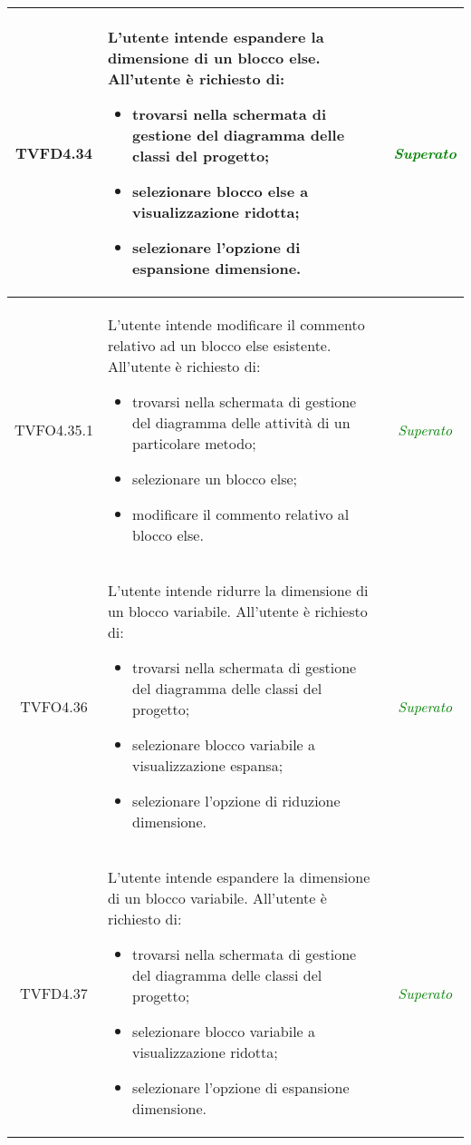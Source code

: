 \begin{longtable}{|c|>{}m{8cm}|c|}
\hypertarget{TVFD4.34}{TVFD4.34} & L'utente intende espandere la dimensione di un blocco else.
All'utente è richiesto di:
\begin{itemize}
	\item trovarsi nella schermata di gestione del diagramma delle classi del progetto;
	\item selezionare blocco else a visualizzazione ridotta;
	\item selezionare l'opzione di espansione dimensione.
\end{itemize} & \textcolor{Green}{\textit{Superato}}\\ \hline

\hypertarget{TVFO4.35.1}{TVFO4.35.1} & L'utente intende modificare il commento relativo ad un blocco else esistente.
All'utente è richiesto di:
\begin{itemize}
	\item trovarsi nella schermata di gestione del diagramma delle attività di un particolare metodo;
	\item selezionare un blocco else;
	\item modificare il commento relativo al blocco else.
\end{itemize} & \textcolor{Green}{\textit{Superato}}\\ \hline

\hypertarget{TVFO4.36}{TVFO4.36} & L'utente intende ridurre la dimensione di un blocco variabile.
All'utente è richiesto di:
\begin{itemize}
	\item trovarsi nella schermata di gestione del diagramma delle classi del progetto;
	\item selezionare blocco variabile a visualizzazione espansa;
	\item selezionare l'opzione di riduzione dimensione.
\end{itemize} & \textcolor{Green}{\textit{Superato}}\\ \hline

\hypertarget{TVFD4.37}{TVFD4.37} & L'utente intende espandere la dimensione di un blocco variabile.
All'utente è richiesto di:
\begin{itemize}
	\item trovarsi nella schermata di gestione del diagramma delle classi del progetto;
	\item selezionare blocco variabile a visualizzazione ridotta;
	\item selezionare l'opzione di espansione dimensione.
\end{itemize} & \textcolor{Green}{\textit{Superato}}\\ \hline


\end{longtable}
